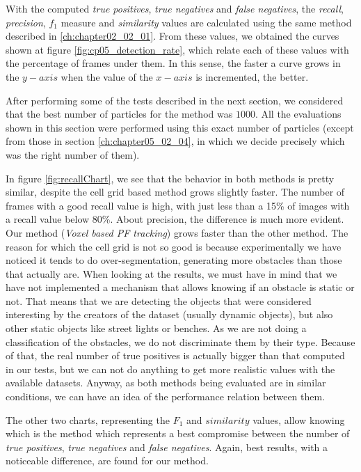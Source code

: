 With the computed \emph{true positives}, \emph{true negatives} and \emph{false negatives}, the \emph{recall}, \emph{precision}, \emph{$f_1$} measure and \emph{similarity} values are calculated using the same method described in \ref{ch:chapter02_02_01}. From these values, we obtained the curves shown at figure \ref{fig:cp05_detection_rate}, which relate each of these values with the percentage of frames under them. In this sense, the faster a curve grows in the $y-axis$ when the value of the $x-axis$ is incremented, the better.

After performing some of the tests described in the next section, we considered that the best number of particles for the method was $1000$. All the evaluations shown in this section were performed using this exact number of particles (except from those in section \ref{ch:chapter05_02_04}, in which we decide precisely which was the right number of them).

In figure \ref{fig:recallChart}, we see that the behavior in both methods is pretty similar, despite the cell grid based method grows slightly faster. The number of frames with a good recall value is high, with just less than a 15\% of images with a recall value below 80\%. About precision, the difference is much more evident. Our method (\emph{Voxel based PF tracking}) grows faster than the other method. The reason for which the cell grid is not so good is because experimentally we have noticed it tends to do over-segmentation, generating more obstacles than those that actually are. When looking at the results, we must have in mind that we have not implemented a mechanism that allows knowing if an obstacle is static or not. That means that we are detecting the objects that were considered interesting by the creators of the dataset (usually dynamic objects), but also other static objects like street lights or benches. As we are not doing a classification of the obstacles, we do not discriminate them by their type. Because of that, the real number of true positives is actually bigger than that computed in our tests, but we can not do anything to get more realistic values with the available datasets. Anyway, as both methods being evaluated are in similar conditions, we can have an idea of the performance relation between them.

The other two charts, representing the $F_1$ and $similarity$ values, allow knowing which is the method which represents a best compromise between the number of \emph{true positives}, \emph{true negatives} and \emph{false negatives}. Again, best results, with a noticeable difference, are found for our method.

